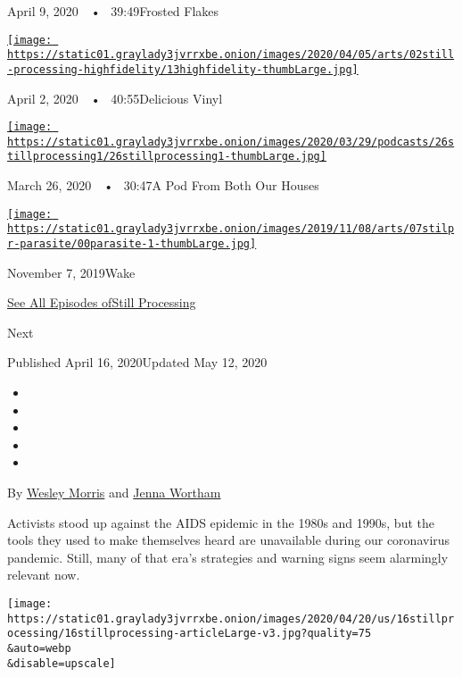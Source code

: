 April 9, 2020~~•~ 39:49Frosted Flakes

\href{https://www.nytimes3xbfgragh.onion/2020/04/02/podcasts/high-fidelity-zoe-kravitz.html?action=click\&module=audio-series-bar\&region=header\&pgtype=Article}{\texttt{[image: https://static01.graylady3jvrrxbe.onion/images/2020/04/05/arts/02still-processing-highfidelity/13highfidelity-thumbLarge.jpg]}}

April 2, 2020~~•~ 40:55Delicious Vinyl

\href{https://www.nytimes3xbfgragh.onion/2020/03/26/podcasts/still-processing-quarantine.html?action=click\&module=audio-series-bar\&region=header\&pgtype=Article}{\texttt{[image: https://static01.graylady3jvrrxbe.onion/images/2020/03/29/podcasts/26stillprocessing1/26stillprocessing1-thumbLarge.jpg]}}

March 26, 2020~~•~ 30:47A Pod From Both Our Houses

\href{https://www.nytimes3xbfgragh.onion/2019/11/07/podcasts/still-processing-parasite-watchmen-bong-joon-ho.html?action=click\&module=audio-series-bar\&region=header\&pgtype=Article}{\texttt{[image: https://static01.graylady3jvrrxbe.onion/images/2019/11/08/arts/07stilpr-parasite/00parasite-1-thumbLarge.jpg]}}

November 7, 2019Wake

\href{https://www.nytimes3xbfgragh.onion/column/still-processing-podcast}{See
All Episodes ofStill Processing}

Next

Published April 16, 2020Updated May 12, 2020

\begin{itemize}
\item
\item
\item
\item
\item
\end{itemize}

By \href{https://www.nytimes3xbfgragh.onion/by/wesley-morris}{Wesley
Morris} and
\href{https://www.nytimes3xbfgragh.onion/by/jenna-wortham}{Jenna
Wortham}

Activists stood up against the AIDS epidemic in the 1980s and 1990s, but
the tools they used to make themselves heard are unavailable during our
coronavirus pandemic. Still, many of that era's strategies and warning
signs seem alarmingly relevant now.

\texttt{[image: https://static01.graylady3jvrrxbe.onion/images/2020/04/20/us/16stillprocessing/16stillprocessing-articleLarge-v3.jpg?quality=75\\\&auto=webp\\\&disable=upscale]}

